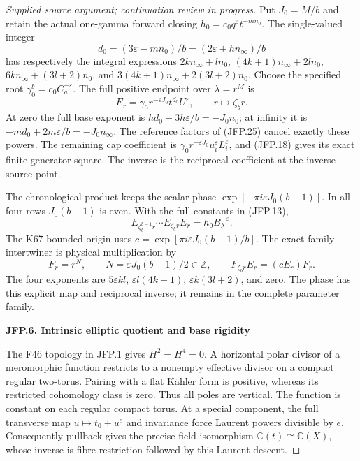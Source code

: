 \begin{proof}[Supplied source argument; continuation review in progress]
Put \(J_0=M/b\) and retain the actual one-gamma forward closing
\(h_0=c_0q^\varepsilon t^{-mn_0}\). The single-valued integer
\[
 d_0=(3\varepsilon-mn_0)/b=(2\varepsilon+hn_\infty)/b
\tag{JFP.26}
\]
has respectively the integral expressions
\(2kn_\infty+ln_0\),
\((4k+1)n_\infty+2ln_0\),
\(6kn_\infty+(3l+2)n_0\), and
\(3(4k+1)n_\infty+2(3l+2)n_0\).
Choose the specified root \(\gamma_0^b=c_0C_a^{-\varepsilon}\).
The full positive endpoint over \(\lambda=r^M\) is
\[
 E_r=\gamma_0r^{-\varepsilon J_0}t^{d_0}U^\varepsilon,
 \qquad r\longmapsto\zeta_b r.
\tag{JFP.27}
\]
At zero the full base exponent is
\(hd_0-3h\varepsilon/b=-J_0n_0\); at infinity it is
\(-md_0+2m\varepsilon/b=-J_0n_\infty\).
The reference factors of (JFP.25) cancel exactly these powers.
The remaining cap coefficient is
\(\gamma_0r^{-\varepsilon J_0}u_i^\varepsilon L_i^\varepsilon\),
and (JFP.18) gives its exact finite-generator square. The inverse
is the reciprocal coefficient at the inverse source point.

The chronological product keeps the scalar phase
\(\exp[-\pi i\varepsilon J_0(b-1)]\). In all four rows
\(J_0(b-1)\) is even. With the full constants in (JFP.13),
\[
 E_{\zeta_b^{b-1}r}\cdots E_{\zeta_b r}E_r
 =h_0 B_\lambda^{-\varepsilon}.
\tag{JFP.28}
\]
The K67 bounded origin uses
\(c=\exp[\pi i\varepsilon J_0(b-1)/b]\). The exact family
intertwiner is physical multiplication by
\[
 F_r=r^N,\qquad N=\varepsilon J_0(b-1)/2\in\mathbb Z,
 \qquad F_{\zeta_b r}E_r=(cE_r)F_r.
\tag{JFP.29}
\]
The four exponents are \(5\varepsilon kl\),
\(\varepsilon l(4k+1)\), \(\varepsilon k(3l+2)\), and zero.
The phase has this explicit map and reciprocal inverse; it remains
in the complete parameter family.

\par

\medskip\noindent\textbf{JFP.6. Intrinsic elliptic quotient and base rigidity}

\par\nobreak

The F46 topology in JFP.1 gives \(H^2=H^4=0\). A horizontal
polar divisor of a meromorphic function restricts to a nonempty
effective divisor on a compact regular two-torus. Pairing with a
flat Kähler form is positive, whereas its restricted cohomology
class is zero. Thus all poles are vertical. The function is
constant on each regular compact torus. At a special component,
the full transverse map \(u\mapsto t_0+u^e\) and invariance
force Laurent powers divisible by \(e\). Consequently pullback
gives the precise field isomorphism \(\mathbb C(t)\cong\mathbb C(X)\),
whose inverse is fibre restriction followed by this Laurent descent.


\end{proof}
